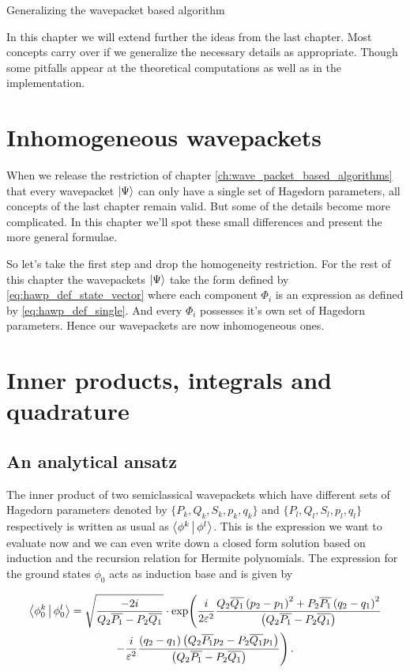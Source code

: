 \begin{chapter}{Generalizing the wavepacket based algorithm}
\label{ch:multi_family_algorithms}

In this chapter we will extend further the ideas from the last chapter. Most concepts
carry over if we generalize the necessary details as appropriate. Though some pitfalls
appear at the theoretical computations as well as in the implementation.

\section{Inhomogeneous wavepackets}

When we release the restriction of chapter \ref{ch:wave_packet_based_algorithms}
that every wavepacket $\Ket{\Psi}$ can only have a single set of Hagedorn parameters,
all concepts of the last chapter remain valid. But some of the details become more
complicated. In this chapter we'll spot these small differences and present the more
general formulae.

So let's take the first step and drop the homogeneity restriction. For the rest
of this chapter the wavepackets $\Ket{\Psi}$ take the form defined by \eqref{eq:hawp_def_state_vector}
where each component $\Phi_i$ is an expression as defined by \eqref{eq:hawp_def_single}.
And every $\Phi_i$ possesses it's own set of Hagedorn parameters. Hence our wavepackets
are now inhomogeneous ones.

\section{Inner products, integrals and quadrature}

\subsection{An analytical ansatz}

The inner product of two semiclassical wavepackets which have different sets
of Hagedorn parameters denoted by $\{P_k, Q_k, S_k, p_k, q_k\}$ and $\{P_l, Q_l, S_l, p_l, q_l\}$
respectively is written as usual as $\Braket{ \phi^k | \phi^l }$.
This is the expression we want to evaluate now and we can even write down
a closed form solution based on induction and the recursion relation for
Hermite polynomials. The expression for the ground states $\phi_0$ acts as
induction base and is given by

\begin{multline} \label{eq:multifamily_innerp_ground}
  \Braket{ \phi_0^k | \phi_0^l } =
  \sqrt{\frac{-2 i}{Q_2 \overline{P_1} - P_2 \overline{Q_1}}} \cdot
    \exp \Biggl(
      \frac{i}{2 \varepsilon^2}
      \frac{Q_2 \overline{Q_1} \left(p_2-p_1\right)^2 + P_2 \overline{P_1} \left(q_2-q_1\right)^2}
            {\left(Q_2 \overline{P_1} - P_2 \overline{Q_1}\right)}
    \\
    -\frac{i}{\varepsilon^2}
    \frac{\left(q_2-q_1\right) \left( Q_2 \overline{P_1} p_2 - P_2 \overline{Q_1} p_1\right)}
         {\left(Q_2 \overline{P_1} - P_2 \overline{Q_1}\right)}
    \Biggr) \,.
\end{multline}


\end{chapter}
